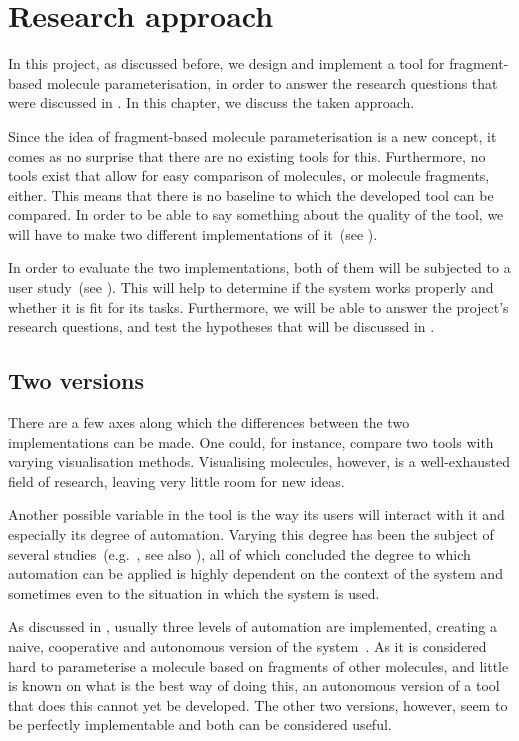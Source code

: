 \chapter{Research approach}

In this project, as discussed before, we design and implement a tool for fragment-based molecule parameterisation, in order to answer the research questions that were discussed in . In this chapter, we discuss the taken approach. 

Since the idea of fragment-based molecule parameterisation is a new concept, it comes as no surprise that there are no existing tools for this. Furthermore, no tools exist that allow for easy comparison of molecules, or molecule fragments, either. This means that there is no baseline to which the developed tool can be compared. In order to be able to say something about the quality of the tool, we will have to make two different implementations of it~(see ).

In order to evaluate the two implementations, both of them will be subjected to a user study~(see ). This will help to determine if the system works properly and whether it is fit for its tasks. Furthermore, we will be able to answer the project's research questions, and test the hypotheses that will be discussed in .



\section{Two versions}
There are a few axes along which the differences between the two implementations can be made. One could, for instance, compare two tools with varying visualisation methods. Visualising molecules, however, is a well-exhausted field of research, leaving very little room for new ideas.

Another possible variable in the tool is the way its users will interact with it and especially its degree of automation. Varying this degree has been the subject of several studies~(e.g.~\cite{payne2000varying, horvitz1999principles, marcus1987taking, norman1990problem}, see also ), all of which concluded the degree to which automation can be applied is highly dependent on the context of the system and sometimes even to the situation in which the system is used.

As discussed in , usually three levels of automation are implemented, creating a naive, cooperative and autonomous version of the system~\cite{payne2000varying}. As it is considered hard to parameterise a molecule based on fragments of other molecules, and little is known on what is the best way of doing this, an autonomous version of a tool that does this cannot yet be developed. The other two versions, however, seem to be perfectly implementable and both can be considered useful.

